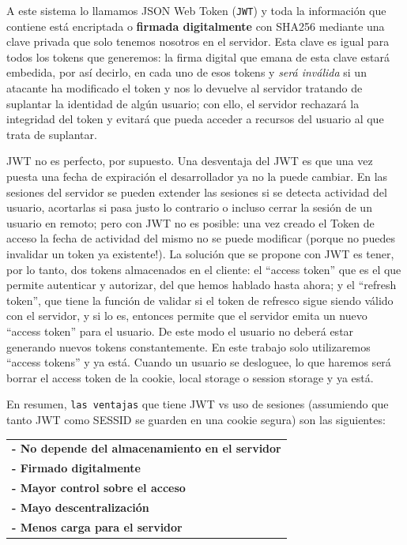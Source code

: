\documentclass[a4paper,12pt]{report}
\begin{document}
				
				A este sistema lo llamamos JSON Web Token (\texttt{JWT}) y toda la información que contiene está encriptada o \textbf{firmada digitalmente} con SHA256 mediante una clave privada que solo tenemos nosotros en el servidor. Esta clave es igual para todos los tokens que generemos: la firma digital que emana de esta clave estará embedida, por así decirlo, en cada uno de esos tokens y \textit{será inválida} si un atacante ha modificado el token y nos lo devuelve al servidor tratando de suplantar la identidad de algún usuario; con ello, el servidor rechazará la integridad del token y evitará que pueda acceder a recursos del usuario al que trata de suplantar.
				
				JWT no es perfecto, por supuesto. Una desventaja del JWT es que una vez puesta una fecha de expiración el desarrollador ya no la puede cambiar. En las sesiones del servidor se pueden extender las sesiones si se detecta actividad del usuario, acortarlas si pasa justo lo contrario o incluso cerrar la sesión de un usuario en remoto; pero con JWT no es posible: una vez creado el Token de acceso la fecha de actividad del mismo no se puede modificar (porque no puedes invalidar un token ya existente!). La solución que se propone con JWT es tener, por lo tanto, dos tokens almacenados en el cliente: el ``access token'' que es el que permite autenticar y autorizar, del que hemos hablado hasta ahora; y el ``refresh token'', que tiene la función de validar si el token de refresco sigue siendo válido con el servidor, y si lo es, entonces permite que el servidor emita un nuevo ``access token'' para el usuario. De este modo el usuario no deberá estar generando nuevos tokens constantemente. En este trabajo solo utilizaremos ``access tokens'' y ya está. Cuando un usuario se desloguee, lo que haremos será borrar el access token de la cookie, local storage o session storage y ya está.
			
				 
				 \noindent En resumen, \texttt{las ventajas} que tiene JWT vs uso de sesiones (assumiendo que tanto JWT como SESSID se guarden en una cookie segura) son las siguientes:
				 
					\begin{tabular}{l}
						\textbf{- No depende del almacenamiento en el servidor} \\
						\textbf{- Firmado digitalmente} \\
						\textbf{- Mayor control sobre el acceso} \\
						\textbf{- Mayo descentralización} \\
						\textbf{- Menos carga para el servidor}
					\end{tabular}
									 
\end{document}
